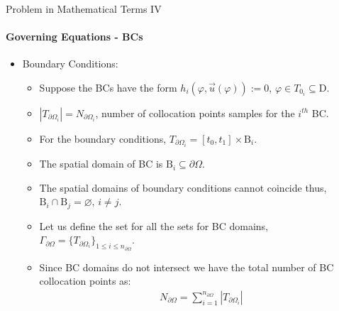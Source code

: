 \documentclass{beamer}
\begin{document}
\begin{frame}{Problem in Mathematical Terms IV}
\framesubtitle{Governing Equations - BCs}

\begin{itemize}
    \item Boundary Conditions:
    \begin{itemize}
        \item Suppose the BCs have the form $h_i(\varphi, \vec{u}(\varphi)) := 0$, $\varphi \in T_{0_i} \subseteq \mathrm{D}.$
        \item $\left|T_{{\partial\Omega}_i}\right| = N_{{\partial\Omega}_i}$, number of collocation points samples for the $i^{th}$ BC.
        \item For the boundary conditions, $T_{{\partial\Omega}_i} = \left[t_0,t_1\right] \times \mathrm{B}_i$.
        \item The spatial domain of BC is $\mathrm{B}_i \subseteq \partial\Omega$.
        \item The spatial domains of boundary conditions cannot coincide thus, $ \mathrm{B}_i \cap \mathrm{B}_j = \varnothing,\, i \neq j$.
        \item Let us define the set for all the sets for BC domains, $\Gamma_{\partial\Omega} = \{T_{{\partial\Omega}_i}\}_{1\leq i \leq n_{\partial\Omega}}$.
        \item Since BC domains do not intersect we have the total number of BC collocation points as:
        \begin{align*}
            N_{\partial\Omega} = \sum \limits_{i=1}^{n_{\partial\Omega}}\left|T_{{\partial\Omega}_i}\right|
        \end{align*}
    \end{itemize}
\end{itemize}
    
\end{frame}
\end{document}
